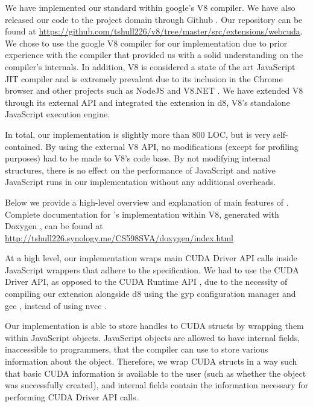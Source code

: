 
We have implemented our \name standard within google's V8 \cite{V8website} compiler. We
have also released our code to the project domain through Github \cite{github}.
Our repository can be found at
\url{https://github.com/tshull226/v8/tree/master/src/extensions/webcuda}.  We chose to use
the google V8  compiler for our implementation due to prior experience with the
compiler that provided us with a solid understanding on the compiler's
internals. In addition, V8 is considered a state of the art JavaScript JIT
compiler and is extremely prevalent due to its inclusion in the Chrome browser
\cite{chromium} and other projects such as NodeJS \cite{nodeJS} and V8.NET
\cite{V8.NET}. We have extended V8 through its external API and integrated the
extension in d8, V8's standalone JavaScript execution engine. 

In total, our implementation is slightly more than 800 LOC, but is very
self-contained. By using the external V8 API, no modifications (except for
profiling purposes) had to be made to V8's code base. By not modifying internal
structures, there is no effect on the performance of JavaScript and native
JavaScript runs in our implementation without any additional overheads.

Below we provide a high-level overview and explanation of main features of
\namens.  Complete documentation for \namens's implementation within V8,
generated with Doxygen \cite{doxygen}, can be found at
\url{http://tshull226.synology.me/CS598SVA/doxygen/index.html}

At a high level, our implementation wraps main CUDA Driver API
\cite{cudaAPI} calls inside JavaScript wrappers that adhere to the \name
specification. We had to use the CUDA Driver API, as opposed to the CUDA Runtime
API \cite{cudaRuntimeAPI}, due to the necessity of compiling our extension
alongside d8 using the gyp \cite{gyp} configuration manager and gcc \cite{gcc},
instead of using nvcc \cite{nvcc}.

Our implementation is able to store handles to CUDA structs by wrapping them
within JavaScript objects. JavaScript objects are allowed to have internal
fields, inaccessible to programmers, that the compiler can use to store various
information about the object. Therefore, we wrap CUDA structs in a way such that
basic CUDA information is available to the user (such as whether the object was
successfully created), and internal fields contain the information
necessary for performing CUDA Driver API calls.


